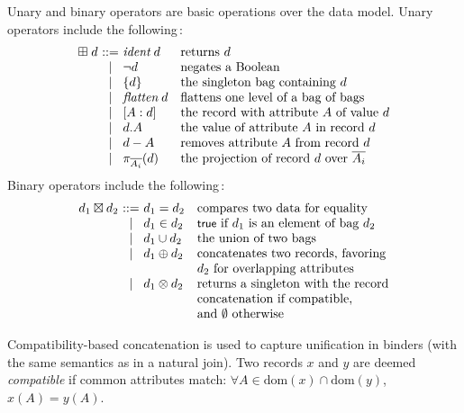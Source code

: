 Unary and binary operators are basic operations over the data
model. Unary operators include the
following\,:
$$
\begin{array}{l@{\ }c@{\ }ll}
  \opunop\;d & ::= &
  \textit{ident}\;d & \mbox{returns $d$}
  \\ & \mid &
  \opnot d              & \mbox{negates a Boolean}
  \\ & \mid &
  \{d\}                 & \mbox{the singleton bag containing~$d$}
  \\ & \mid &
  \opflatten\;d         & \mbox{flattens one level of a bag of bags}
  \\ & \mid &
  \mbox{[} A : d \mbox{]}  & \mbox{the record with attribute $A$ of value~$d$}
  \\ & \mid &
  d.A                   & \mbox{the value of attribute $A$ in record $d$}
  \\ & \mid &
  d - A                 & \mbox{removes attribute $A$ from record $d$}
  \\ & \mid &
  \pi_{\overline{A_i}}(d) & \mbox{the projection of record $d$ over $\overline{A_i}$}
\end{array}
$$
Binary operators include the following\,:
$$
\begin{array}{l@{\ }c@{\ }ll}
  d_1 \opbinop d_2 & ::= &
  d_1 = d_2 & \mbox{compares two data for equality}
  \\ & \mid &
  d_1 \in d_2 & \mbox{$\true$ if $d_1$ is an element of bag $d_2$}
  \\ & \mid &
  d_1 \cup d_2 & \mbox{the union of two bags}
  \\ & \mid &
  d_1 \opconcat d_2 & \mbox{concatenates two records, favoring}\\ &&&
              \mbox{$d_2$ for overlapping attributes}
  \\ & \mid &
  d_1 \opmergeconcat d_2 & \mbox{returns a singleton with the record}\\ &&&
              \mbox{concatenation if compatible,}\\ &&&
              \mbox{and $\emptyset$ otherwise}
\end{array}
$$

Compatibility-based concatenation is used to capture unification in
binders (with the same semantics as in a natural join). Two records
$x$ and $y$ are deemed \emph{compatible} if common attributes match:
$\forall{A\in\textrm{dom}(x)\cap\textrm{dom}(y)}$, $x(A) = y(A)$.

